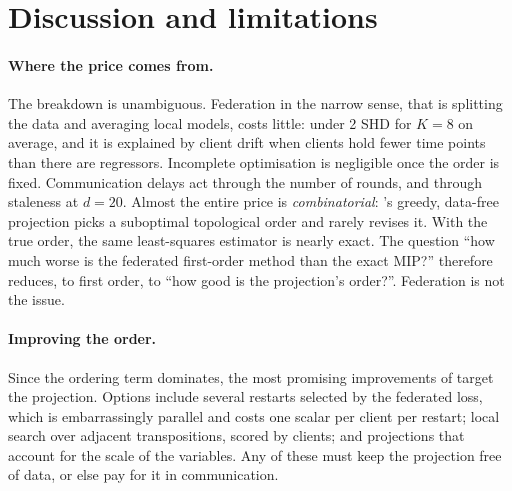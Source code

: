 \section{Discussion and limitations}
\label{sec:discussion}

\paragraph{Where the price comes from.}
The breakdown is unambiguous. Federation in the narrow sense, that is splitting the data
and averaging local models, costs little: under 2 SHD for $K=8$ on average, and it is
explained by client drift when clients hold fewer time points than there are regressors.
Incomplete optimisation is negligible once the order is fixed. Communication delays act
through the number of rounds, and through staleness at $d=20$. Almost the entire price is
\emph{combinatorial}: \psidag's greedy, data-free projection picks a suboptimal
topological order and rarely revises it. With the true order, the same least-squares
estimator is nearly exact. The question ``how much worse is the federated first-order method
than the exact MIP?'' therefore reduces, to first order, to ``how good is the projection's
order?''. Federation is not the issue.

\paragraph{Improving the order.}
Since the ordering term dominates, the most promising improvements of \feddbn{} target the
projection. Options include several restarts selected by the federated loss, which is
embarrassingly parallel and costs one scalar per client per restart; local search over
adjacent transpositions, scored by clients; and projections that account for the scale of
the variables. Any of these must keep the projection free of data, or else pay for it in
communication.

